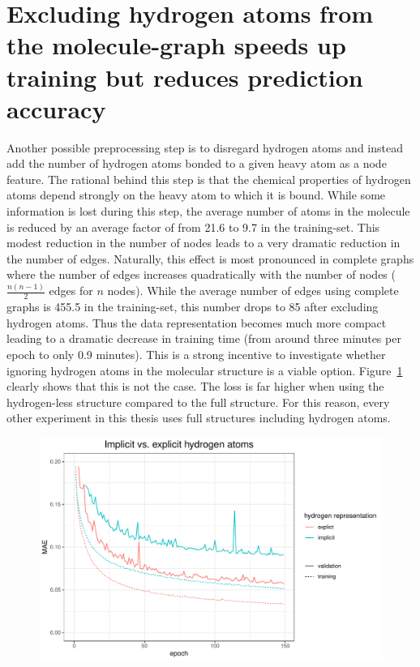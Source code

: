 \section{Excluding hydrogen atoms from the molecule-graph speeds up training but reduces prediction accuracy}

Another possible preprocessing step is to disregard hydrogen atoms and instead add the number of hydrogen atoms bonded to a given heavy atom as a node feature. The rational behind this step is that the chemical properties of hydrogen atoms depend strongly on the heavy atom to which it is bound. While some information is lost during this step, the average number of atoms in the molecule is reduced by an average factor of
%
from 21.6 to 9.7 in the training-set. This modest reduction in the number of nodes leads to a very dramatic reduction in the number of edges. Naturally, this effect is most pronounced in complete graphs where the number of edges increases quadratically with the number of nodes ($\frac{n(n - 1)}{2}$ edges for $n$ nodes). While the average number of edges using complete graphs is 455.5 in the training-set, this number drops to 85 after excluding hydrogen atoms. Thus the data representation becomes much more compact leading to a dramatic decrease in training time (from around three minutes per epoch to only 0.9 minutes). This is a strong incentive to investigate whether ignoring hydrogen atoms in the molecular structure is a viable option. Figure~\ref{fig:implicit-hydrogens} clearly shows that this is not the case. The loss is far higher when using the hydrogen-less structure compared to the full structure. For this reason, every other experiment in this thesis uses full structures including hydrogen atoms.

\begin{figure}[H]
	\includegraphics[width=\linewidth]{figures/implict-hydrogens.pdf}
	
	\caption{}
	\label{fig:implicit-hydrogens}
\end{figure}

